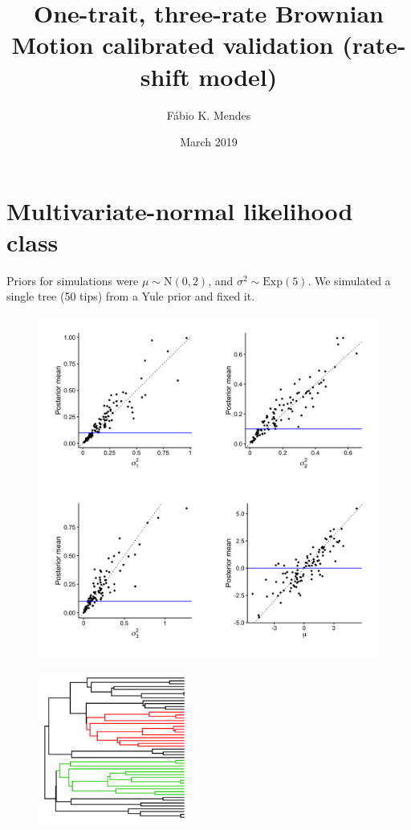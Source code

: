 \documentclass{article}
\title{One-trait, three-rate Brownian Motion calibrated validation
  (rate-shift model)}
\author{F\'{a}bio K. Mendes}
\date{March 2019}
\begin{document}
\maketitle

\newpage

\section{Multivariate-normal likelihood class}

Priors for simulations were $\mu \sim \text{N}(0, 2)$, and $\sigma^2 \sim \text{Exp}(5)$. We simulated a single tree (50 tips) from a Yule prior and fixed it.

\begin{figure}[h]
  \centering
  \includegraphics[width=12cm]{../BMMVNShiftThreeRates_ultra_graphs.png}
\end{figure}

\begin{figure}[h]
  \centering
  \includegraphics[width=5cm]{../BMMVNShiftThreeRates_ultra_tree.png}
\end{figure}
\end{document}

